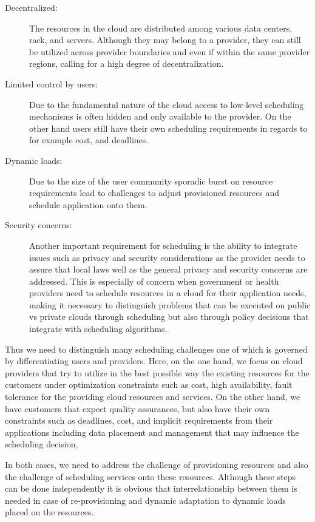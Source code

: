 \documentclass[final,5p,times,twocolumn]{elsarticle}
\begin{document}
\begin{description}
\item [Decentralized:] The resources in the cloud are distributed among various data centers, rack, and servers. Although they may belong to a provider, they can still be utilized across provider boundaries and even if within the same provider regions, calling for a high degree of decentralization.

\item[Limited control by users:] Due to the fundamental nature of the cloud access to low-level scheduling mechanisms is often hidden and only available to the provider. On the other hand users still have their own scheduling requirements in regards to for example cost, and deadlines.
 
\item[Dynamic loads:] Due to the size of the user community sporadic burst on resource requirements lead to challenges to adjust provisioned resources and schedule application onto them.

\item[Security concerns:] Another important requirement for scheduling is the ability to integrate issues such as privacy and security considerations as the provider needs to assure that local laws well as the general privacy and security concerns are addressed. This is especially of concern when government or health providers need to schedule resources in a cloud for their application needs, making it necessary to distinguish problems that can be executed on public vs private clouds through scheduling but also through policy decisions that integrate with scheduling algorithms.
 
\end{description}

Thus we need to distinguish many scheduling challenges one of which is governed by differentiating users and providers. Here, on the one hand, we focus on cloud providers that try to utilize in the best possible way the existing resources for the customers under optimization constraints such as cost, high availability, fault tolerance for the providing cloud resources and services. On the other hand, we have customers that expect quality assurances, but also have their own constraints such as deadlines, cost, and implicit requirements from their applications including data placement and management that may influence the scheduling decision,

In both cases, we need to address the challenge of provisioning resources and also the challenge of scheduling services onto these resources. Although these steps can be done independently it is obvious that interrelationship between them is needed in case of re-provisioning and dynamic adaptation to dynamic loads placed on the resources.
\end{document}
